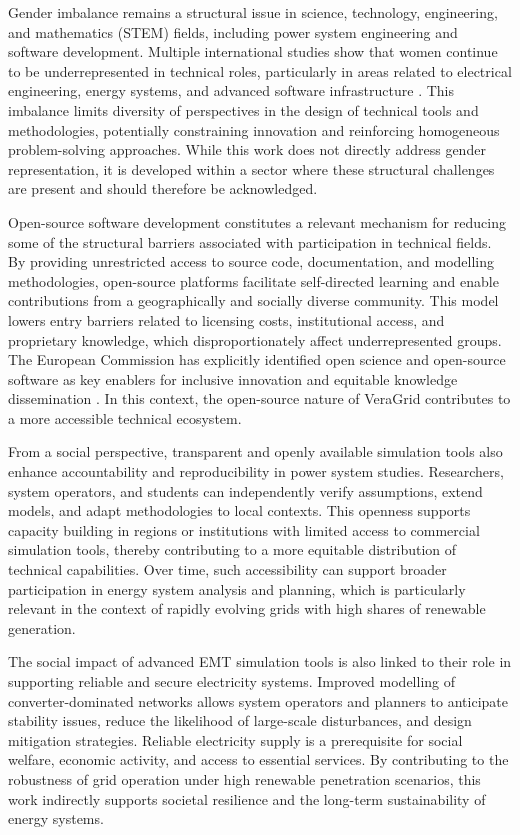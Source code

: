 Gender imbalance remains a structural issue in science, technology, engineering, and mathematics (STEM) fields, 
including power system engineering and software development. Multiple international studies show that women continue to be 
underrepresented in technical roles, particularly in areas related to electrical engineering, energy systems, and advanced 
software infrastructure \cite{UNESCOWomenSTEM, OECDGenderSTEM}. This imbalance limits diversity of perspectives in the 
design of technical tools and methodologies, potentially constraining innovation and reinforcing homogeneous problem-solving 
approaches. While this work does not directly address gender representation, it is developed within a sector where these 
structural challenges are present and should therefore be acknowledged.

Open-source software development constitutes a relevant mechanism for reducing some of the structural barriers associated 
with participation in technical fields. By providing unrestricted access to source code, documentation, and modelling 
methodologies, open-source platforms facilitate self-directed learning and enable contributions from a geographically and 
socially diverse community. This model lowers entry barriers related to licensing costs, institutional access, and proprietary 
knowledge, which disproportionately affect underrepresented groups. The European Commission has explicitly identified open 
science and open-source software as key enablers for inclusive innovation and equitable knowledge dissemination \cite{EUOpenScience}. 
In this context, the open-source nature of VeraGrid contributes to a more accessible technical ecosystem.

From a social perspective, transparent and openly available simulation tools also enhance accountability and reproducibility
in power system studies. Researchers, system operators, and students can independently verify assumptions, extend models, 
and adapt methodologies to local contexts. This openness supports capacity building in regions or institutions with limited 
access to commercial simulation tools, thereby contributing to a more equitable distribution of technical capabilities. 
Over time, such accessibility can support broader participation in energy system analysis and planning, which is particularly 
relevant in the context of rapidly evolving grids with high shares of renewable generation.

The social impact of advanced EMT simulation tools is also linked to their role in supporting reliable and secure electricity 
systems. Improved modelling of converter-dominated networks allows system operators and planners to anticipate stability issues, 
reduce the likelihood of large-scale disturbances, and design mitigation strategies. Reliable electricity supply is a 
prerequisite for social welfare, economic activity, and access to essential services. By contributing to the robustness of 
grid operation under high renewable penetration scenarios, this work indirectly supports societal resilience and the long-term 
sustainability of energy systems.

